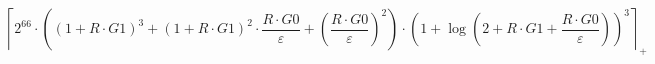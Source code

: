 \[\left\lceil 2^{66} \cdot \left(\left(1 + R \cdot G1\right)^{3} + \left(1 + R \cdot G1\right)^{2} \cdot \frac{R \cdot G0}{\varepsilon} + \left(\frac{R \cdot G0}{\varepsilon}\right)^{2}\right) \cdot \left(1 + \log\left(2 + R \cdot G1 + \frac{R \cdot G0}{\varepsilon}\right)\right)^{3} \right\rceil_{+}\]
